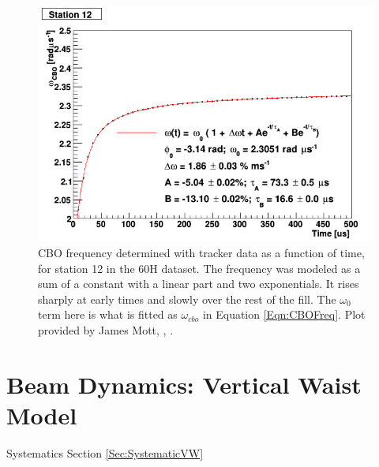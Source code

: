 	\begin{figure}[]
		\centering
		\includegraphics[width=\textwidth]{TrackerCBOModel}
	    \caption[TrackerCBOModel]{CBO frequency determined with tracker data as a function of time, for station 12 in the 60H dataset. The frequency was modeled as a sum of a constant with a linear part and two exponentials. It rises sharply at early times and slowly over the rest of the fill. The $\omega_{0}$ term here is what is fitted as $\omega_{cbo}$ in Equation \ref{Eqn:CBOFreq}. Plot provided by James Mott, , \cite{TrackerFreq}.}
	    \label{fig:TrackerCBOModel}
	\end{figure}

\clearpage

\section{Beam Dynamics: Vertical Waist Model}
\label{Sec:VW}

	\noindent Systematics Section \ref{Sec:SystematicVW} \\

